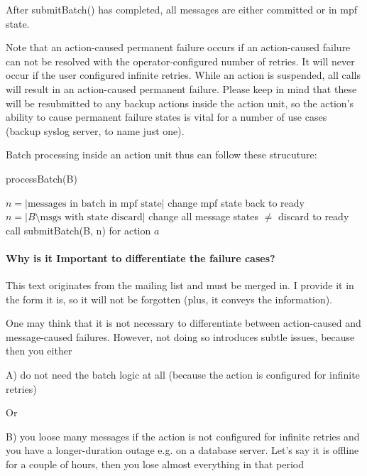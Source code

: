 \documentclass[a4paper,10pt]{article}
\begin{document}
After submitBatch() has completed, all messages are either committed or in mpf state.

Note that an action-caused permanent failure occurs if an action-caused failure can not be resolved with the operator-configured number of retries. It will never occur if the user configured infinite retries. While an action is suspended, all calls will result in an action-caused permanent failure. Please keep in mind that these will be resubmitted to any backup actions inside the action unit, so the action's ability to cause permanent failure states is vital for a number of use cases (backup syslog server, to name just one).

Batch processing inside an action unit thus can follow these strucuture:

\begin{algorithm}
\caption{processBatch(B)}
\begin{algorithmic}
		\STATE $n = |\text{messages in batch in mpf state}|$
		\STATE change mpf state back to ready
	\ELSE
		\STATE $n = |B \setminus \text{msgs with state discard}|$
		\STATE change all message states $\ne$ discard to ready 
	\ENDIF
		\STATE call submitBatch(B, n) for action $a$
	\ENDIF
\ENDFOR
\end{algorithmic}
\end{algorithm}

\paragraph{Why is it Important to differentiate the failure cases?}
This text originates from the mailing list and must be merged in. I provide it in the form it is, so it will not be forgotten (plus, it conveys the information).

One may think that it is not necessary to differentiate between action-caused and message-caused failures. However, not doing so introduces subtle issues, because 
then you either 

A) do not need the batch logic at all (because the action is configured for
infinite retries)

Or

B) you loose many messages if the action is not configured for infinite
retries and you have a longer-duration outage e.g. on a database server.
Let's say it is offline for a couple of hours, then you lose almost
everything in that period
\end{document}
